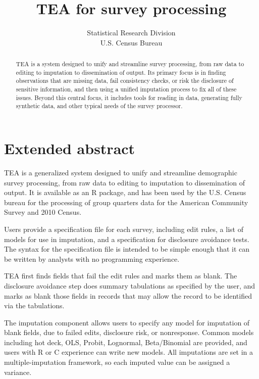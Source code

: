 \documentclass{article}
\begin{document}
\author{Statistical Research Division\\U.S. Census Bureau}
\title{TEA for survey processing}
\maketitle

\begin{abstract}
TEA is a system designed to unify and streamline survey processing, from raw data to
editing to imputation to dissemination of output. Its primary focus is in finding 
observations that are missing data, fail consistency checks, or risk the disclosure of
sensitive information, and then using a unified imputation process to fix all of these
issues. Beyond this central focus, it includes tools for reading in data, generating
fully synthetic data, and other typical needs of the survey processor.
\end{abstract}

\section{Extended abstract}

TEA is a generalized system designed to unify and streamline demographic
survey processing, from raw data to editing to imputation to dissemination
of output. It is available as an R package, and has been used by the
U.S. Census bureau for the processing of group quarters data for the
American Community Survey and 2010 Census.

Users provide a specification file for each survey, including edit
rules, a list of models for use in imputation, and a specification for
disclosure avoidance tests. The syntax for the specification file is
intended to be simple enough that it can be written by analysts with no
programming experience.

TEA first finds fields that fail the edit rules and marks them as
blank. The disclosure avoidance step does summary tabulations as specified
by the user, and marks as blank those fields in records that may allow
the record to be identified via the tabulations.

The imputation component allows users to specify any model for
imputation of blank fields, due to failed edits, disclosure risk, or
nonresponse. Common models including hot deck, OLS, Probit, Lognormal,
Beta/Binomial are provided, and users with R or C experience can write
new models. All imputations are set in a multiple-imputation framework,
so each imputed value can be assigned a variance.
\end{document}
